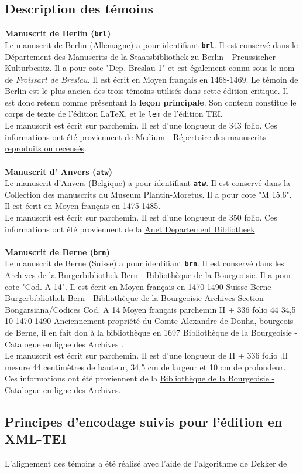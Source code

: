 \documentclass[12pt, a4paper]{article}
\begin{document}
\subsection{Description des témoins} \noindent \textbf{Manuscrit de Berlin (\texttt{brl})}\\ \indent Le manuscrit de Berlin (Allemagne) a pour identifiant \textbf{\texttt{brl}}. Il est conservé dans le Département des Manuscrits de la Staatsbibliothek zu Berlin - Preussischer Kulturbesitz. Il a pour cote "Dep. Breslau 1" et est également connu sous le nom de \textit{Froissart de Breslau}. Il est écrit en Moyen français en 1468-1469. Le témoin de Berlin est le plus ancien des trois témoins utilisés dans cette édition critique. Il est donc retenu comme présentant la \textbf{leçon principale}. Son contenu constitue le corps de texte de l'édition \LaTeX, et le \texttt{lem} de l'édition TEI.\\ \indent Le manuscrit est écrit sur parchemin. Il est d'une longueur de 343 folio. Ces informations ont été proviennent de \href{http://medium-avance.irht.cnrs.fr/ark:/63955/md44pk02gf53}{Medium - Répertoire des manuscrits reproduits ou recensés}.\\~\\\noindent \textbf{Manuscrit d' Anvers (\texttt{atw})}\\ \indent Le manuscrit d'Anvers (Belgique) a pour identifiant \textbf{\texttt{atw}}. Il est conservé dans la Collection des manuscrits du Museum Plantin-Moretus. Il a pour cote "M 15.6". Il est écrit en Moyen français en 1475-1485.\\ \indent Le manuscrit est écrit sur parchemin. Il est d'une longueur de 350 folio. Ces informations ont été proviennent de la \href{https://anet.be/record/opacmpm/c:lvd:14057240/F}{Anet Departement Bibliotheek}.\\~\\\noindent \textbf{Manuscrit de Berne (\texttt{brn})}\\ \indent Le manuscrit de Berne (Suisse) a pour identifiant \textbf{\texttt{brn}}. Il est conservé dans les Archives de la Burgerbibliothek Bern - Bibliothèque de la Bourgeoisie. Il a pour cote "Cod. A 14". Il est écrit en Moyen français en 1470-1490 Suisse Berne Burgerbibliothek Bern - Bibliothèque de la Bourgeoisie Archives Section Bongarsiana/Codices Cod. A 14 Moyen français parchemin II + 336 folio 44 34,5 10 1470-1490 Anciennement propriété du Comte Alexandre de Donha, bourgeois de Berne, il en fait don à la bibliothèque en 1697 Bibliothèque de la Bourgeoisie - Catalogue en ligne des Archives .\\ \indent Le manuscrit est écrit sur parchemin. Il est d'une longueur de II + 336 folio .Il mesure 44 centimètres de hauteur, 34,5 cm de largeur et 10 cm de profondeur. Ces informations ont été proviennent de la \href{http://katalog.burgerbib.ch/detail.aspx?ID=147296}{Bibliothèque de la Bourgeoisie - Catalogue en ligne des Archives}. \subsection{Principes d'encodage suivis pour l'édition en XML-TEI} L'alignement des témoins a été réalisé avec l'aide de l'algorithme de Dekker de 
\end{document}
